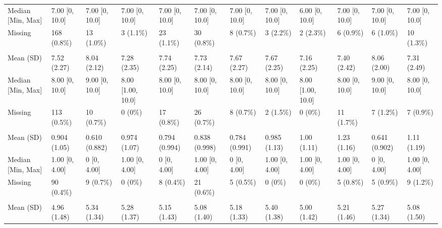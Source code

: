 \documentclass[
  single column]{article}
\begin{document}
\begin{landscape}
\begin{tabular}[t]{llllllllllll}
\hspace{1em}Median [Min, Max] & 7.00 [0, 10.0] & 7.00 [0, 10.0] & 7.00 [0, 10.0] & 7.00 [0, 10.0] & 7.00 [0, 10.0] & 7.00 [0, 10.0] & 7.00 [0, 10.0] & 6.00 [0, 10.0] & 7.00 [0, 10.0] & 7.00 [0, 10.0] & 7.00 [0, 10.0]\\
\hspace{1em}Missing & 168 (0.8\%) & 13 (1.0\%) & 3 (1.1\%) & 23 (1.1\%) & 30 (0.8\%) & 8 (0.7\%) & 3 (2.2\%) & 2 (2.3\%) & 6 (0.9\%) & 6 (1.0\%) & 10 (1.3\%)\\
\addlinespace[0.3em]
\multicolumn{12}{l}{\textbf{pwb\_your\_relationships}}\\
\hspace{1em}Mean (SD) & 7.52 (2.27) & 8.04 (2.12) & 7.28 (2.35) & 7.74 (2.25) & 7.73 (2.14) & 7.67 (2.27) & 7.67 (2.25) & 7.16 (2.25) & 7.40 (2.42) & 8.06 (2.00) & 7.31 (2.49)\\
\hspace{1em}Median [Min, Max] & 8.00 [0, 10.0] & 9.00 [0, 10.0] & 8.00 [1.00, 10.0] & 8.00 [0, 10.0] & 8.00 [0, 10.0] & 8.00 [0, 10.0] & 8.00 [0, 10.0] & 8.00 [1.00, 10.0] & 8.00 [0, 10.0] & 9.00 [0, 10.0] & 8.00 [0, 10.0]\\
\hspace{1em}Missing & 113 (0.5\%) & 10 (0.7\%) & 0 (0\%) & 17 (0.8\%) & 26 (0.7\%) & 8 (0.7\%) & 2 (1.5\%) & 0 (0\%) & 11 (1.7\%) & 7 (1.2\%) & 7 (0.9\%)\\
\addlinespace[0.3em]
\multicolumn{12}{l}{\textbf{rumination}}\\
\hspace{1em}Mean (SD) & 0.904 (1.05) & 0.610 (0.882) & 0.974 (1.07) & 0.794 (0.994) & 0.838 (0.998) & 0.784 (0.991) & 0.985 (1.13) & 1.00 (1.11) & 1.23 (1.16) & 0.641 (0.902) & 1.11 (1.19)\\
\hspace{1em}Median [Min, Max] & 1.00 [0, 4.00] & 0 [0, 4.00] & 1.00 [0, 4.00] & 0 [0, 4.00] & 1.00 [0, 4.00] & 0 [0, 4.00] & 1.00 [0, 4.00] & 1.00 [0, 4.00] & 1.00 [0, 4.00] & 0 [0, 4.00] & 1.00 [0, 4.00]\\
\hspace{1em}Missing & 90 (0.4\%) & 9 (0.7\%) & 0 (0\%) & 8 (0.4\%) & 21 (0.6\%) & 5 (0.5\%) & 0 (0\%) & 0 (0\%) & 5 (0.8\%) & 5 (0.9\%) & 9 (1.2\%)\\
\addlinespace[0.3em]
\multicolumn{12}{l}{\textbf{self\_control\_have\_lots}}\\
\hspace{1em}Mean (SD) & 4.96 (1.48) & 5.34 (1.34) & 5.28 (1.37) & 5.15 (1.43) & 5.08 (1.40) & 5.18 (1.33) & 5.40 (1.38) & 5.00 (1.42) & 5.21 (1.46) & 5.27 (1.34) & 5.08 (1.50)\\

\end{tabular}
\end{landscape}
\end{document}

